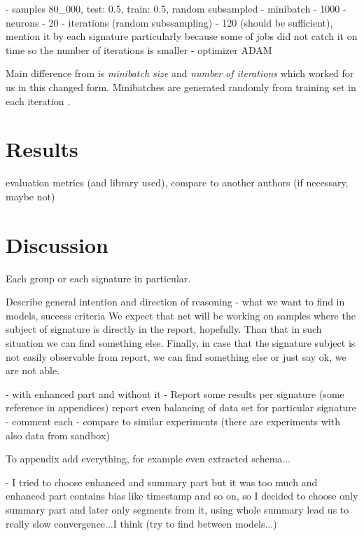 - samples 80_000, test: 0.5, train: 0.5, random subsampled
- minibatch - 1000
- neurons - 20
- iterations (random subssampling) - 120 (should be sufficient), mention it by each signature particularly because some of jobs did not catch it on time so the number of iterations is smaller
- optimizer ADAM 

Main difference from \cite{Mandlik} is \emph{minibatch size} and \emph{number of iterations} which worked for us in this changed form. Minibatches are generated randomly from training set in each iteration .


\section{Results}
evaluation metrics (and library used), compare to another authors (if necessary, maybe not)

\section{Discussion}
Each group or each signature in particular.




Describe general intention and direction of reasoning - what we want to find in models, success criteria
We expect that net will be working on samples where the subject of signature is directly in the report, hopefully. Than that in such situation we can find something else. Finally, in case that the signature subject is not easily observable from report, we can find something else or just say ok, we are not able.

- with enhanced part and without it
  - Report some results per signature (some reference in appendices) report even balancing of data set for particular signature
  - comment each
  - compare to similar experiments (there are experiments with also data from sandbox)



To appendix add everything, for example even extracted schema...


- I tried to choose enhanced and summary part but it was too much and enhanced part contains bias like timestamp and so on, so I decided to choose only summary part and later only segments from it, using whole summary lead us to really slow convergence...I think (try to find between models...)

